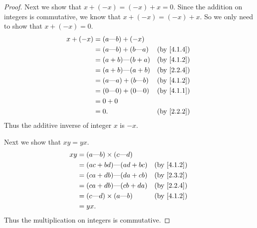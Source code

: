 \begin{proof}
  Next we show that \(x + (-x) = (-x) + x = 0\).
  Since the addition on integers is commutative, we know that \(x + (-x) = (-x) + x\).
  So we only need to show that \(x + (-x) = 0\).
  \begin{align*}
    x + (-x) & = (a \text{---} b) + (-x)                                        \\
             & = (a \text{---} b) + (b \text{---} a) & \text{(by \cref{4.1.4})} \\
             & = (a + b) \text{---} (b + a)          & \text{(by \cref{4.1.2})} \\
             & = (a + b) \text{---} (a + b)          & \text{(by \cref{2.2.4})} \\
             & = (a \text{---} a) + (b \text{---} b) & \text{(by \cref{4.1.2})} \\
             & = (0 \text{---} 0) + (0 \text{---} 0) & \text{(by \cref{4.1.1})} \\
             & = 0 + 0                                                          \\
             & = 0.                                  & \text{(by \cref{2.2.2})}
  \end{align*}
  Thus the additive inverse of integer \(x\) is \(-x\).

  Next we show that \(xy = yx\).
  \begin{align*}
    xy & = (a \text{---} b) \times (c \text{---} d)                            \\
       & = (ac + bd) \text{---} (ad + bc)           & \text{(by \cref{4.1.2})} \\
       & = (ca + db) \text{---} (da + cb)           & \text{(by \cref{2.3.2})} \\
       & = (ca + db) \text{---} (cb + da)           & \text{(by \cref{2.2.4})} \\
       & = (c \text{---} d) \times (a \text{---} b) & \text{(by \cref{4.1.2})} \\
       & = yx.
  \end{align*}
  Thus the multiplication on integers is commutative.


\end{proof}
